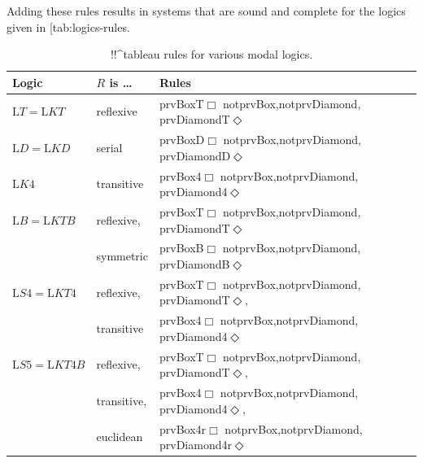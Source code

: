 \documentclass[10pt,a4paper]{article}
\makeatletter
\theoremstyle{plain}
\theoremstyle{definition}
\theoremstyle{remark}
\newcommand*{\ollabel}[1]{\label{#1}}
\newcommand{\olref}{\@ifnextchar[{\olref@i}{\olref@final}}
\def\olref@i[#1]{\@ifnextchar[{\olref@ii}{\olref@final}}
\def\olref@ii[#1]{\@ifnextchar[{\olref@iii}{\olref@final}}
\def\olref@iii[#1]{\olref@final}
\def\olref@final#1{\ref{#1}}
\providecommand{\Log}{\ensuremath{\mathrm{L}}}
\providecommand{\iftag}[1]{#1}
\providecommand{\iftag}{}
\makeatother
\begin{document}
Adding these rules results in systems that are sound and complete for
the logics given in \olref{tab:logics-rules}.

\begin{table}
  \begin{center}
    \begin{tabular}{lll}
      \hline
      Logic & $R$ is \dots & Rules\\
      \hline
      $\Log{T} = \Log{KT}$ & reflexive &
      \iftag{prvBox}{T$\Box$}{}%
      \iftag{notprvBox,notprvDiamond}{}{, }%
      \iftag{prvDiamond}{T$\Diamond$}{}
      \\ \hline
      $\Log{D} = \Log{KD}$ & serial &
      \iftag{prvBox}{D$\Box$}{}%
      \iftag{notprvBox,notprvDiamond}{}{, }%
      \iftag{prvDiamond}{D$\Diamond$}{}
      \\ \hline
      $\Log{K4}$ & transitive &
      \iftag{prvBox}{4$\Box$}{}%
      \iftag{notprvBox,notprvDiamond}{}{, }%
      \iftag{prvDiamond}{4$\Diamond$}{}
      \\ \hline
      $\Log{B} = \Log{KTB}$ & reflexive, &
      \iftag{prvBox}{T$\Box$}{}%
      \iftag{notprvBox,notprvDiamond}{}{, }%
      \iftag{prvDiamond}{T$\Diamond$}{}\\
      & symmetric &
      \iftag{prvBox}{B$\Box$}{}%
      \iftag{notprvBox,notprvDiamond}{}{, }%
      \iftag{prvDiamond}{B$\Diamond$}{}
      \\ \hline
      $\Log{S4} = \Log{KT4}$ & reflexive, &
      \iftag{prvBox}{T$\Box$}{}%
      \iftag{notprvBox,notprvDiamond}{}{, }%
      \iftag{prvDiamond}{T$\Diamond$}{},\\
      & transitive &
      \iftag{prvBox}{4$\Box$}{}%
      \iftag{notprvBox,notprvDiamond}{}{, }%
      \iftag{prvDiamond}{4$\Diamond$}{}
      \\ \hline
      $\Log{S5} = \Log{KT4B}$ & reflexive, &
      \iftag{prvBox}{T$\Box$}{}%
      \iftag{notprvBox,notprvDiamond}{}{, }%
      \iftag{prvDiamond}{T$\Diamond$}{},\\
      & transitive, &
      \iftag{prvBox}{4$\Box$}{}%
      \iftag{notprvBox,notprvDiamond}{}{, }%
      \iftag{prvDiamond}{4$\Diamond$}{},\\
      &  euclidean &
      \iftag{prvBox}{4r$\Box$}{}%
      \iftag{notprvBox,notprvDiamond}{}{, }%
      \iftag{prvDiamond}{4r$\Diamond$}{}
      \\ \hline
    \end{tabular}
  \end{center}
  \caption{!!^{tableau} rules for various modal logics.}
  \ollabel{tab:logics-rules}
\end{table}
\end{document}
